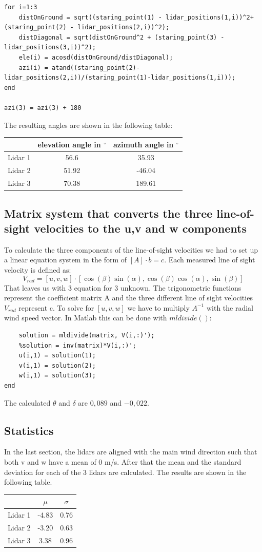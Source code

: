 \documentclass[10pt]{article}
\begin{document}
\begin{lstlisting}
for i=1:3
    distOnGround = sqrt((staring_point(1) - lidar_positions(1,i))^2+(staring_point(2) - lidar_positions(2,i))^2);
    distDiagonal = sqrt(distOnGround^2 + (staring_point(3) - lidar_positions(3,i))^2);
    ele(i) = acosd(distOnGround/distDiagonal);
    azi(i) = atand((staring_point(2)-lidar_positions(2,i))/(staring_point(1)-lidar_positions(1,i)));
end

azi(3) = azi(3) + 180
\end{lstlisting}

The resulting angles are shown in the following table:\\

\begin{tabular}{c||c|c|}
& elevation angle in $^\circ$& azimuth angle in $^\circ$\\
\hline
Lidar 1 &56.6 & 35.93 \\
Lidar 2 &51.92 & -46.04\\
Lidar 3 & 70.38& 189.61\\
\end{tabular}
\subsection{Matrix system that converts the three line-of-sight velocities to the u,v and w components}
To calculate the three components of the line-of-sight velocities we had to set up a linear equation system in the form of $[A] \cdot b = c$. 
Each measured line of sight velocity is defined as:
\begin{equation*}
V_{rad} = [u, v ,w]\cdot[\cos(\beta)\sin(\alpha), \cos(\beta)\cos(\alpha), \sin(\beta)]
\end{equation*}
That leaves us with 3 equation for 3 unknown. 
The trigonometric functions represent the coefficient matrix A and the three different line of sight velocities $V_{rad}$ represent c.
To solve for $[u,v,w]$ we have to multiply $A^{-1}$ with the radial wind speed vector.
In Matlab this can be done with $mldivide()$:

\begin{lstlisting}
    solution = mldivide(matrix, V(i,:)');
    %solution = inv(matrix)*V(i,:)';
    u(i,1) = solution(1);
    v(i,1) = solution(2);
    w(i,1) = solution(3);
end
\end{lstlisting}

The calculated $\theta$ and $\delta$ are $0,089$ and $-0,022$.
\subsection{Statistics}
In the last section, the lidars are aligned with the main wind direction  such that both v and w have a mean of 0 m/s. After that the mean and the standard deviation for each of the 3 lidars are calculated. The results are shown in the following table.\\

\begin{tabular}{c||c|c|}
& $\mu$& $\sigma$\\
\hline
Lidar 1 &-4.83 & 0.76 \\
Lidar 2 &-3.20 & 0.63\\
Lidar 3 & 	3.38& 0.96\\
\end{tabular}
\end{document}
